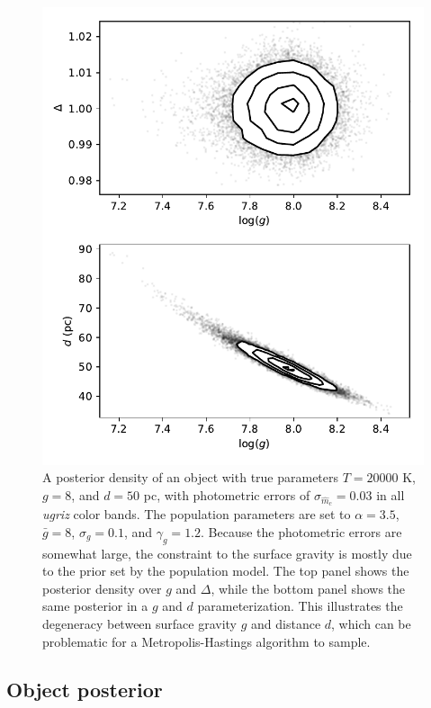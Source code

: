 \documentclass[fleqn,usenatbib]{mnras}
\newcommand{\Teff}{T}
\newcommand{\logg}{g}
\begin{document}
\begin{figure}
	\includegraphics[width=\columnwidth]{banana.pdf}
    \caption{A posterior density of an object with true parameters $\Teff=20000$ K, $\logg=8$, and $d=50$ pc, with photometric errors of $\sigma_{\hat{m}_c}=0.03$ in all \emph{ugriz} color bands. The population parameters are set to $\alpha=3.5$, $\bar{g}=8$, $\sigma_g=0.1$, and $\gamma_g=1.2$. Because the photometric errors are somewhat large, the constraint to the surface gravity is mostly due to the prior set by the population model. The top panel shows the posterior density over $\logg$ and $\Delta$, while the bottom panel shows the same posterior in a $\logg$ and $d$ parameterization. This illustrates the degeneracy between surface gravity $\logg$ and distance $d$, which can be problematic for a Metropolis-Hastings algorithm to sample.}
    \label{fig:banana}
\end{figure}







\subsection{Object posterior}\label{sec:objectposterior}
\end{document}
